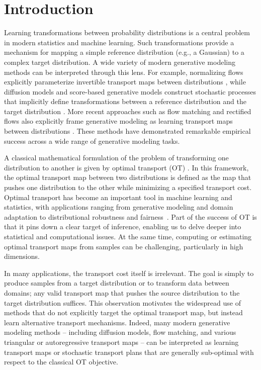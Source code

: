 \documentclass[11pt,twoside]{article}
\begin{document}
\section{Introduction}
Learning transformations between probability distributions is a central problem in modern statistics and machine learning. Such transformations 
provide a mechanism for mapping a simple reference distribution (e.g., a Gaussian) to a complex target distribution. A wide variety of modern generative modeling methods can be interpreted through this lens. For example, normalizing flows explicitly parameterize invertible transport maps between distributions \cite{rezende2015variational,dinh2017density,papamakarios2021normalizing}, while diffusion models and score-based generative models construct stochastic processes that implicitly define transformations between a reference distribution and the target distribution \cite{sohl2015deep,ho2020denoising,song2021score}. More recent approaches such as flow matching and rectified flows also explicitly frame generative modeling as learning transport maps between distributions \cite{lipman2023flowmatching,liu2022rectified,albergo2023stochastic}. These methods have demonstrated remarkable empirical success across a wide range of generative modeling tasks.

A classical mathematical formulation of the problem of transforming one distribution to another is given by optimal transport (OT) \cite{villani2003topics,villani2009optimal}. In this framework, the optimal transport map between two distributions is defined as the map that pushes one distribution to the other while minimizing a specified transport cost. 
Optimal transport has become an important tool in machine learning and statistics, with applications ranging from generative modeling and domain adaptation to distributional robustness and fairness~\cite{peyre2019computational}.
Part of the success of OT is that it pins down a clear target of inference, enabling us to delve deeper into statistical and computational issues.
At the same time, computing or estimating optimal transport maps from samples can be challenging, particularly in high dimensions.

In many applications, the transport cost itself is irrelevant. The goal is simply to produce samples from a target distribution or to transform data between domains; any valid transport map that pushes the source distribution to the target distribution suffices. This observation motivates the widespread use of methods that do not explicitly target the optimal transport map, but instead learn alternative transport mechanisms. Indeed, many modern generative modeling methods -- including diffusion models, flow matching, and various triangular or autoregressive transport maps -- can be interpreted as learning transport maps or stochastic transport plans that are generally sub-optimal with respect to the classical OT objective.
\end{document}
